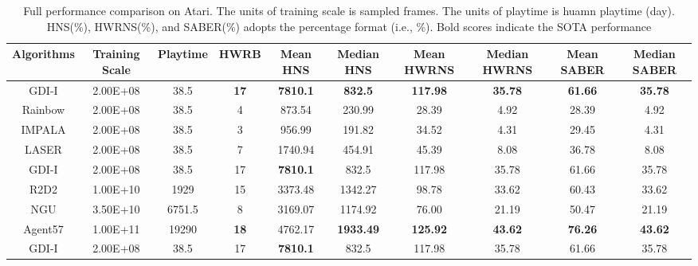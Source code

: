 \documentclass[nohyperref]{article}
\def\GDIImeanhns{7810.1}
\def\GDIImedianhns{832.5}
\def\GDIIHWRB{17}
\def\GDIImeanHWRNS{117.98}
\def\GDIImedianHWRNS{35.78}
\def\GDIImeanSABER{61.66}
\def\GDIImedianSABER{35.78}
\def\GDIInumframes{2.00E+08}
\def\GDIIgametime{38.5}
\def\rainbowmeanhns{873.54}
\def\rainbowmedianhns{230.99}
\def\rainbowHWRB{4}
\def\rainbowmeanHWRNS{28.39}
\def\rainbowmedianHWRNS{4.92}
\def\rainbowmeanSABER{28.39}
\def\rainbowmedianSABER{4.92}
\def\rainbownumframes{2.00E+08}
\def\rainbowgametime{38.5}
\def\impalameanhns{956.99}
\def\impalamedianhns{191.82}
\def\impalaHWRB{3}
\def\impalameanHWRNS{34.52}
\def\impalamedianHWRNS{4.31}
\def\impalameanSABER{29.45}
\def\impalamedianSABER{4.31}
\def\impalanumframes{2.00E+08}
\def\impalagametime{38.5}
\def\lasermeanhns{1740.94}
\def\lasermedianhns{454.91}
\def\laserHWRB{7}
\def\lasermeanHWRNS{45.39}
\def\lasermedianHWRNS{8.08}
\def\lasermeanSABER{36.78}
\def\lasermedianSABER{8.08}
\def\lasernumframes{2.00E+08}
\def\lasergametime{38.5}
\def\rtdtmeanhns{3373.48}
\def\rtdtmedianhns{1342.27}
\def\rtdtHWRB{15}
\def\rtdtmeanHWRNS{98.78}
\def\rtdtmedianHWRNS{33.62}
\def\rtdtmeanSABER{60.43}
\def\rtdtmedianSABER{33.62}
\def\rtdtnumframes{1.00E+10}
\def\rtdtgametime{1929}
\def\ngumeanhns{3169.07}
\def\ngumedianhns{1174.92}
\def\nguHWRB{8}
\def\ngumeanHWRNS{76.00}
\def\ngumedianHWRNS{21.19}
\def\ngumeanSABER{50.47}
\def\ngumedianSABER{21.19}
\def\ngunumframes{3.50E+10}
\def\ngugametime{6751.5}
\def\agentmeanhns{4762.17}
\def\agentmedianhns{1933.49}
\def\agentHWRB{18}
\def\agentmeanHWRNS{125.92}
\def\agentmedianHWRNS{43.62}
\def\agentmeanSABER{76.26}
\def\agentmedianSABER{43.62}
\def\agentnumframes{1.00E+11}
\def\agentgametime{19290}
\theoremstyle{plain}
\begin{document}
\begin{table}[H]
\footnotesize
\centering
\caption{Full performance comparison on Atari. The units of training scale is sampled frames. The units of playtime is huamn playtime (day). HNS(\%), HWRNS(\%), and SABER(\%) adopts the  percentage format (i.e., \%). Bold scores indicate the SOTA performance}
\label{Tab: full performance comparison}
\setlength{\tabcolsep}{1.0pt}
\begin{tabular}{ |c | c | c | c| c c | c c |c c|}
\hline
Algorithms & Training Scale & Playtime & HWRB & Mean HNS & Median HNS & Mean HWRNS & Median HWRNS & Mean SABER  & Median SABER\\
\hline
GDI-I        &\GDIInumframes    & \GDIIgametime    & \textbf{\GDIIHWRB} & \textbf{\GDIImeanhns} & \textbf{\GDIImedianhns}      &\textbf{\GDIImeanHWRNS} & \textbf{\GDIImedianHWRNS}& \textbf{\GDIImeanSABER} & \textbf{\GDIImedianSABER}\\
Rainbow     &\rainbownumframes    & \rainbowgametime     & \rainbowHWRB  & \rainbowmeanhns  & \rainbowmedianhns     &\rainbowmeanHWRNS  & \rainbowmedianHWRNS & \rainbowmeanSABER & \rainbowmedianSABER\\
IMPALA      &\impalanumframes    & \impalagametime     & \impalaHWRB  & \impalameanhns  & \impalamedianhns     &\impalameanHWRNS  & \impalamedianHWRNS & \impalameanSABER & \impalamedianSABER\\
LASER       &\lasernumframes    & \lasergametime     & \laserHWRB  & \lasermeanhns & \lasermedianhns     &\lasermeanHWRNS  & \lasermedianHWRNS & \lasermeanSABER & \lasermedianSABER\\
\hline
\hline
GDI-I        &\GDIInumframes    &\GDIIgametime   & \GDIIHWRB & \textbf{\GDIImeanhns} & \GDIImedianhns     &\GDIImeanHWRNS &\GDIImedianHWRNS & \GDIImeanSABER & \GDIImedianSABER\\
R2D2        &\rtdtnumframes   &\rtdtgametime     & \rtdtHWRB & \rtdtmeanhns & \rtdtmedianhns &\rtdtmeanHWRNS  & \rtdtmedianHWRNS& \rtdtmeanSABER & \rtdtmedianSABER \\
NGU         &\ngunumframes & \ngugametime    & \nguHWRB  & \ngumeanhns & \ngumedianhns    &\ngumeanHWRNS  & \ngumedianHWRNS& \ngumeanSABER & \ngumedianSABER\\
Agent57     &\agentnumframes   & \agentgametime      & \textbf{\agentHWRB} & \agentmeanhns & \textbf{\agentmedianhns}    &\textbf{\agentmeanHWRNS} & \textbf{\agentmedianHWRNS}& \textbf{\agentmeanSABER} & \textbf{\agentmedianSABER}\\
\hline
\hline
GDI-I       &\GDIInumframes    &\GDIIgametime    & \GDIIHWRB & \textbf{\GDIImeanhns} & \GDIImedianhns     &\GDIImeanHWRNS &\GDIImedianHWRNS & \GDIImeanSABER & \GDIImedianSABER\\

\end{tabular}
\end{table}
\end{document}
